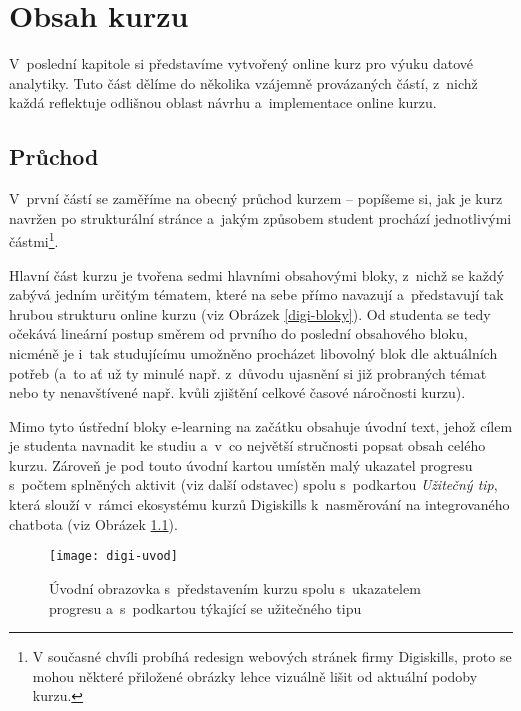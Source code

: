 \hypertarget{obsah-kurzu}{%
\chapter{Obsah kurzu}\label{obsah-kurzu}}

V~poslední kapitole si představíme vytvořený online kurz pro výuku datové analytiky. Tuto část dělíme do několika vzájemně provázaných částí, z~nichž každá reflektuje odlišnou oblast návrhu a~implementace online kurzu.

\hypertarget{prux16fchod}{%
\section{Průchod}\label{prux16fchod}}

V~první částí se zaměříme na obecný průchod kurzem -- popíšeme si, jak je kurz navržen po strukturální stránce a~jakým způsobem student prochází jednotlivými částmi\footnote{V současné chvíli probíhá redesign webových stránek firmy Digiskills, proto se mohou některé přiložené obrázky lehce vizuálně lišit od aktuální podoby kurzu.}.

Hlavní část kurzu je tvořena sedmi hlavními obsahovými bloky, z~nichž se každý zabývá jedním určitým tématem, které na sebe přímo navazují a~představují tak hrubou strukturu online kurzu (viz Obrázek \ref{digi-bloky}). Od studenta se tedy očekává lineární postup směrem od prvního do poslední obsahového bloku, nicméně je i~tak studujícímu umožněno procházet libovolný blok dle aktuálních potřeb (a~to ať už ty minulé např. z~důvodu ujasnění si již probraných témat nebo ty nenavštívené např. kvůli zjištění celkové časové náročnosti kurzu).

Mimo tyto ústřední bloky e-learning na začátku obsahuje úvodní text, jehož cílem je studenta navnadit ke studiu a~v~co největší stručnosti popsat obsah celého kurzu. Zároveň je pod touto úvodní kartou umístěn malý ukazatel progresu s~počtem splněných aktivit (viz další odstavec) spolu s~podkartou \emph{Užitečný tip}, která slouží v~rámci ekosystému kurzů Digiskills k~nasměrování na integrovaného chatbota (viz Obrázek \ref{digi-uvod}).

\begin{figure}[h]   
    \centering
    \texttt{[image: digi-uvod]}  
    \caption{Úvodní obrazovka s~představením kurzu spolu s~ukazatelem progresu a~s~podkartou týkající se užitečného tipu}
    \label{digi-uvod}
\end{figure}

